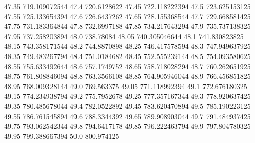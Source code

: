           47.35    719.109072544
           47.4      720.6128622
          47.45    722.118222394
           47.5    723.625153125
          47.55    725.133654394
           47.6      726.6437262
          47.65    728.155368544
           47.7    729.668581425
          47.75    731.183364844
           47.8      732.6997188
          47.85    734.217643294
           47.9    735.737138325
          47.95    737.258203894
           48.0        738.78084
          48.05    740.305046644
           48.1    741.830823825
          48.15    743.358171544
           48.2      744.8870898
          48.25    746.417578594
           48.3    747.949637925
          48.35    749.483267794
           48.4      751.0184682
          48.45    752.555239144
           48.5    754.093580625
          48.55    755.633492644
           48.6      757.1749752
          48.65    758.718028294
           48.7    760.262651925
          48.75    761.808846094
           48.8      763.3566108
          48.85    764.905946044
           48.9    766.456851825
          48.95    768.009328144
           49.0       769.563375
          49.05    771.118992394
           49.1    772.676180325
          49.15    774.234938794
           49.2      775.7952678
          49.25    777.357167344
           49.3    778.920637425
          49.35    780.485678044
           49.4      782.0522892
          49.45    783.620470894
           49.5    785.190223125
          49.55    786.761545894
           49.6      788.3344392
          49.65    789.908903044
           49.7    791.484937425
          49.75    793.062542344
           49.8      794.6417178
          49.85    796.222463794
           49.9    797.804780325
          49.95    799.388667394
           50.0       800.974125
